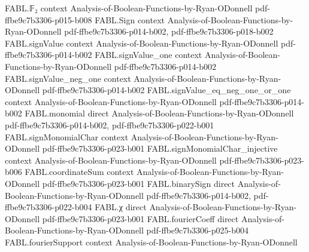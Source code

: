 \begin{theorem}
\label{FABL.exists_scheduledRestrictedFourierWeightEstimatorProgram_failureProbability_le}
\leanok
{}
\proofstep
  {FABL.𝔽₂}
  {context}
  {Analysis-of-Boolean-Functions-by-Ryan-ODonnell}
  {pdf-ffbe9c7b3306-p015-b008}
\proofstep
  {FABL.Sign}
  {context}
  {Analysis-of-Boolean-Functions-by-Ryan-ODonnell}
  {pdf-ffbe9c7b3306-p014-b002,
    pdf-ffbe9c7b3306-p018-b002}
\proofstep
  {FABL.signValue}
  {context}
  {Analysis-of-Boolean-Functions-by-Ryan-ODonnell}
  {pdf-ffbe9c7b3306-p014-b002}
\proofstep
  {FABL.signValue_one}
  {context}
  {Analysis-of-Boolean-Functions-by-Ryan-ODonnell}
  {pdf-ffbe9c7b3306-p014-b002}
\proofstep
  {FABL.signValue_neg_one}
  {context}
  {Analysis-of-Boolean-Functions-by-Ryan-ODonnell}
  {pdf-ffbe9c7b3306-p014-b002}
\proofstep
  {FABL.signValue_eq_neg_one_or_one}
  {context}
  {Analysis-of-Boolean-Functions-by-Ryan-ODonnell}
  {pdf-ffbe9c7b3306-p014-b002}
\proofstep
  {FABL.monomial}
  {direct}
  {Analysis-of-Boolean-Functions-by-Ryan-ODonnell}
  {pdf-ffbe9c7b3306-p014-b002,
    pdf-ffbe9c7b3306-p022-b001}
\proofstep
  {FABL.signMonomialChar}
  {context}
  {Analysis-of-Boolean-Functions-by-Ryan-ODonnell}
  {pdf-ffbe9c7b3306-p023-b001}
\proofstep
  {FABL.signMonomialChar_injective}
  {context}
  {Analysis-of-Boolean-Functions-by-Ryan-ODonnell}
  {pdf-ffbe9c7b3306-p023-b006}
\proofstep
  {FABL.coordinateSum}
  {context}
  {Analysis-of-Boolean-Functions-by-Ryan-ODonnell}
  {pdf-ffbe9c7b3306-p023-b001}
\proofstep
  {FABL.binarySign}
  {direct}
  {Analysis-of-Boolean-Functions-by-Ryan-ODonnell}
  {pdf-ffbe9c7b3306-p014-b002,
    pdf-ffbe9c7b3306-p022-b004}
\proofstep
  {FABL.χ}
  {direct}
  {Analysis-of-Boolean-Functions-by-Ryan-ODonnell}
  {pdf-ffbe9c7b3306-p023-b001}
\proofstep
  {FABL.fourierCoeff}
  {direct}
  {Analysis-of-Boolean-Functions-by-Ryan-ODonnell}
  {pdf-ffbe9c7b3306-p025-b004}
\proofstep
  {FABL.fourierSupport}
  {context}
  {Analysis-of-Boolean-Functions-by-Ryan-ODonnell}

\end{theorem}
